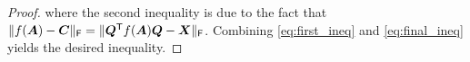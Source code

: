 \begin{proof}
    where the second inequality is due to the fact that $\|f(\bm{A})-\bm{C}\|_{\textsf{\textup{F}}} =\|\bm{Q}^{\textsf{\textup{T}}} f(\bm{A})\bm{Q}-\bm{X}\|_{\textsf{\textup{F}}}$. Combining \eqref{eq:first_ineq} and \eqref{eq:final_ineq} yields the desired inequality.
\end{proof}

